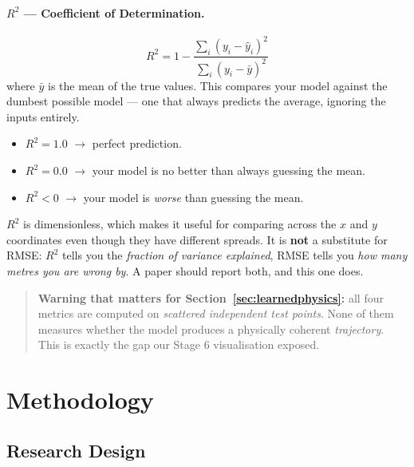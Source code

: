 \documentclass[11pt,a4paper]{article}
\newcommand{\Rsq}{R^{2}}
\begin{document}
\paragraph{$\Rsq$ --- Coefficient of Determination.}
\begin{equation}
  \Rsq = 1-\frac{\sum_{i}(y_{i}-\hat{y}_{i})^{2}}{\sum_{i}(y_{i}-\bar{y})^{2}}
\end{equation}
where $\bar{y}$ is the mean of the true values. This compares your model against the dumbest
possible model --- one that always predicts the average, ignoring the inputs entirely.

\begin{itemize}[leftmargin=2em,itemsep=0.1em]
  \item $\Rsq=1.0$ $\rightarrow$ perfect prediction.
  \item $\Rsq=0.0$ $\rightarrow$ your model is no better than always guessing the mean.
  \item $\Rsq<0$ $\rightarrow$ your model is \emph{worse} than guessing the mean.
\end{itemize}

$\Rsq$ is dimensionless, which makes it useful for comparing across the $x$ and $y$ coordinates
even though they have different spreads. It is \textbf{not} a substitute for RMSE: $\Rsq$ tells you
the \emph{fraction of variance explained}, RMSE tells you \emph{how many metres you are wrong by}.
A paper should report both, and this one does.

\begin{quote}
\textbf{Warning that matters for Section~\ref{sec:learnedphysics}:} all four metrics are computed
on \emph{scattered independent test points}. None of them measures whether the model produces a
physically coherent \emph{trajectory}. This is exactly the gap our Stage 6 visualisation exposed.
\end{quote}

\section{Methodology}\label{sec:method}

\subsection{Research Design}
\end{document}
